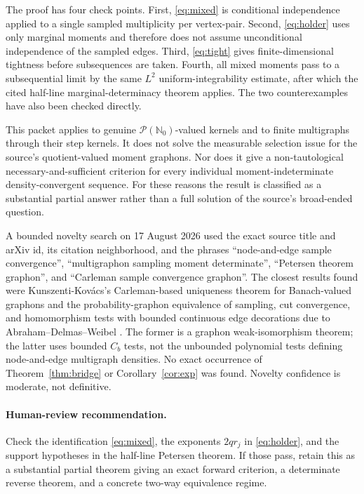 \documentclass[11pt]{article}
\theoremstyle{remark}
\newcommand{\N}{\mathbb N}
\begin{document}
The proof has four check points.  First, \eqref{eq:mixed} is conditional
independence applied to a single sampled multiplicity per vertex-pair.
Second, \eqref{eq:holder} uses only marginal moments and therefore does not
assume unconditional independence of the sampled edges.  Third,
\eqref{eq:tight} gives finite-dimensional tightness before subsequences are
taken.  Fourth, all mixed moments pass to a subsequential limit by the same
$L^2$ uniform-integrability estimate, after which the cited half-line
marginal-determinacy theorem applies.  The two counterexamples have also been
checked directly.

This packet applies to genuine $\mathcal P(\N_0)$-valued kernels and to finite
multigraphs through their step kernels.  It does not solve the measurable
selection issue for the source's quotient-valued moment graphons.  Nor does it
give a non-tautological necessary-and-sufficient criterion for every
individual moment-indeterminate density-convergent sequence.  For these
reasons the result is classified as a substantial partial answer rather than
a full solution of the source's broad-ended question.

A bounded novelty search on 17 August 2026 used the exact source title and
arXiv id, its citation neighborhood, and the phrases ``node-and-edge sample
convergence'', ``multigraphon sampling moment determinate'', ``Petersen
theorem graphon'', and ``Carleman sample convergence graphon''.  The closest
results found were Kunszenti-Kov\'acs's Carleman-based uniqueness theorem for
Banach-valued graphons \cite{KK} and the probability-graphon equivalence of
sampling, cut convergence, and homomorphism tests with bounded continuous
edge decorations due to Abraham--Delmas--Weibel \cite{ADW}.  The former is a
graphon weak-isomorphism theorem; the latter uses bounded $C_b$ tests, not the
unbounded polynomial tests defining node-and-edge multigraph densities.  No
exact occurrence of Theorem~\ref{thm:bridge} or Corollary~\ref{cor:exp} was
found.  Novelty confidence is moderate, not definitive.

\paragraph{Human-review recommendation.}
Check the identification \eqref{eq:mixed}, the exponents $2qr_j$ in
\eqref{eq:holder}, and the support hypotheses in the half-line Petersen
theorem.  If those pass, retain this as a substantial partial theorem giving
an exact forward criterion, a determinate reverse theorem, and a concrete
two-way equivalence regime.
\end{document}
